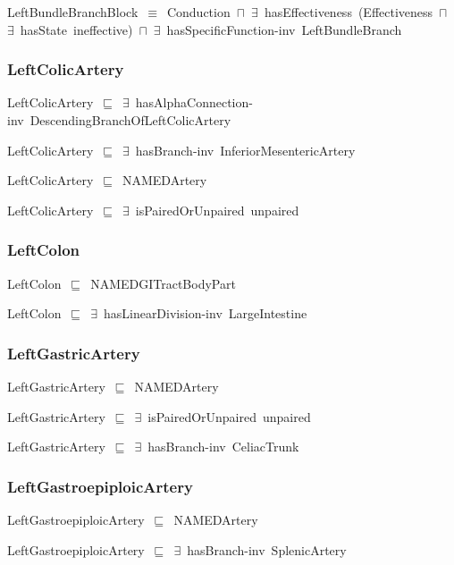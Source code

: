 \documentclass{article}
\begin{document}
LeftBundleBranchBlock~\ensuremath{\equiv}~Conduction~\ensuremath{\sqcap}~\ensuremath{\exists}~hasEffectiveness~(Effectiveness~\ensuremath{\sqcap}~\ensuremath{\exists}~hasState~ineffective)~\ensuremath{\sqcap}~\ensuremath{\exists}~hasSpecificFunction-inv~LeftBundleBranch

\subsubsection*{LeftColicArtery}

LeftColicArtery~\ensuremath{\sqsubseteq}~\ensuremath{\exists}~hasAlphaConnection-inv~DescendingBranchOfLeftColicArtery~

LeftColicArtery~\ensuremath{\sqsubseteq}~\ensuremath{\exists}~hasBranch-inv~InferiorMesentericArtery~

LeftColicArtery~\ensuremath{\sqsubseteq}~NAMEDArtery~

LeftColicArtery~\ensuremath{\sqsubseteq}~\ensuremath{\exists}~isPairedOrUnpaired~unpaired~

\subsubsection*{LeftColon}

LeftColon~\ensuremath{\sqsubseteq}~NAMEDGITractBodyPart~

LeftColon~\ensuremath{\sqsubseteq}~\ensuremath{\exists}~hasLinearDivision-inv~LargeIntestine~

\subsubsection*{LeftGastricArtery}

LeftGastricArtery~\ensuremath{\sqsubseteq}~NAMEDArtery~

LeftGastricArtery~\ensuremath{\sqsubseteq}~\ensuremath{\exists}~isPairedOrUnpaired~unpaired~

LeftGastricArtery~\ensuremath{\sqsubseteq}~\ensuremath{\exists}~hasBranch-inv~CeliacTrunk~

\subsubsection*{LeftGastroepiploicArtery}

LeftGastroepiploicArtery~\ensuremath{\sqsubseteq}~NAMEDArtery~

LeftGastroepiploicArtery~\ensuremath{\sqsubseteq}~\ensuremath{\exists}~hasBranch-inv~SplenicArtery~
\end{document}
